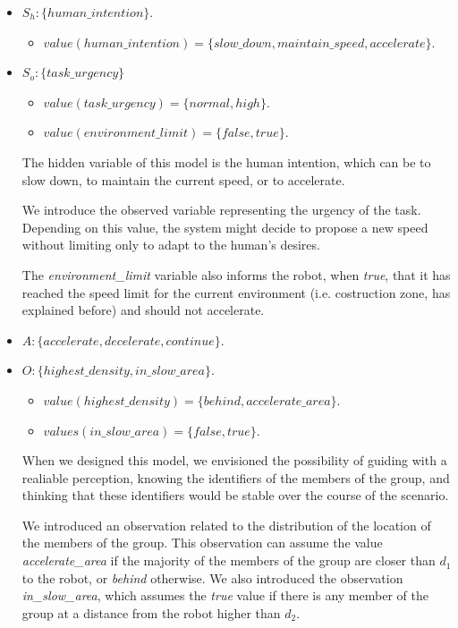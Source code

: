 \begin{itemize}
	\item $S_h:\{human\_intention\}$.
		\begin{itemize}
			\item $value(human\_intention)=\{slow\_down, maintain\_speed, accelerate\}$.
		\end{itemize}
	\item $S_o:\{task\_urgency\}$
		\begin{itemize}
			\item $value(task\_urgency)=\{normal,high\}$.
			\item $value(environment\_limit)=\{false,true\}$.
		\end{itemize}
		The hidden variable of this model is the human intention, which can be to slow down, to maintain the current speed, or to accelerate.

		We introduce the observed variable representing the urgency of the task. Depending on this value, the system might decide to propose a new speed without limiting only to adapt to the human's desires.

		The \textit{environment\_limit} variable also informs the robot, when \textit{true}, that it has reached the speed limit for the current environment (i.e. costruction zone, has explained before) and should not accelerate.
	
	\item $A:\{accelerate,decelerate,continue\}$.
	\item $O:\{highest\_density,in\_slow\_area\}$.
		\begin{itemize}
			\item $value(highest\_density)=\{behind,accelerate\_area\}$.
			\item $values(in\_slow\_area)=\{false,true\}$.
		\end{itemize}

		When we designed this model, we envisioned the possibility of guiding with a realiable perception, knowing the identifiers of the members of the group, and thinking that these identifiers would be stable over the course of the scenario. 

		We introduced an observation related to the distribution of the location of the members of the group. This observation can assume the value \textit{accelerate\_area} if the majority of the members of the group are closer than $d_1$ to the robot, or \textit{behind} otherwise. We also introduced the observation \textit{in\_slow\_area}, which assumes the \textit{true} value if there is any member of the group at a distance from the robot higher than $d_2$.


\end{itemize}
